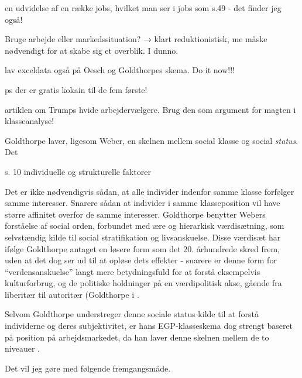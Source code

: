 en udvidelse af en række jobs, hvilket man ser i jobs som s.49 - det finder jeg også!




Bruge arbejde eller markedssituation?
	→ klart reduktionistisk, me måske nødvendigt for at skabe sig et overblik. I dunno.

lav exceldata også på Oesch og Goldthorpes skema. Do it now!!! 




ps der er gratis kokain til de fem første!





artiklen om Trumps hvide arbejdervælgere. Brug den som argument for magten i klasseanalyse!


Goldthorpe laver, ligesom Weber, en skelnen mellem social klasse og social \emph{status}. Det 



s. 10 individuelle og strukturelle faktorer 



Det er ikke nødvendigvis sådan, at alle individer indenfor samme klasse forfølger samme interesser. Snarere sådan at individer i samme klasseposition vil have større affinitet overfor de samme interesser. Goldthorpe benytter Webers forståelse af social orden, forbundet med ære og hierarkisk værdisætning, som selvstændig kilde til social stratifikation og livsanskuelse. Disse værdisæt har ifølge Goldthorpe antaget en løsere form som det 20. århundrede skred frem, uden at det dog ser ud til at opløse dets effekter - snarere er denne form for “verdensanskuelse” langt mere betydningsfuld for at forstå eksempelvis kulturforbrug, og de politiske holdninger på en værdipolitisk akse, gående fra liberitær til autoritær (Goldthorpe i \parencite[95]{Harrits2014}. 

Selvom Goldthorpe understreger denne sociale status kilde til at forstå individerne og deres subjektivitet, er hans EGP-klasseskema dog strengt baseret på position på arbejdsmarkedet, da han laver denne skelnen mellem de to niveauer \parencite[95]{Harrits2014}. 








 









Det vil jeg gøre med følgende fremgangsmåde. 

